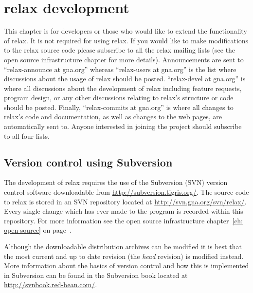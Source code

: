 
\chapter{relax development} \label{ch: relax devel}

This chapter is for developers or those who would like to extend the functionality of relax.  It is not required for using relax.  If you would like to make modifications to the relax source code please subscribe to all the relax mailing lists (see the open source infrastructure chapter for more details).  Announcements are sent to ``relax-announce at gna.org'' whereas ``relax-users at gna.org'' is the list where discussions about the usage of relax should be posted.  ``relax-devel at gna.org'' is where all discussions about the development of relax including feature requests, program design, or any other discussions relating to relax's structure or code should be posted.  Finally, ``relax-commits at gna.org'' is where all changes to relax's code and documentation, as well as changes to the web pages, are automatically sent to.  Anyone interested in joining the project should subscribe to all four lists.




\section{Version control using Subversion}\label{svn repository}

The development of relax requires the use of the Subversion (SVN) version control software downloadable from \href{http://subversion.tigris.org/}{http://subversion.tigris.org/}.  The source code to relax is stored in an SVN repository located at \href{http://svn.gna.org/svn/relax/}{http://svn.gna.org/svn/relax/}.  Every single change which has ever made to the program is recorded within this repository.  For more information see the open source infrastructure chapter~\ref{ch: open source} on page~\pageref{ch: open source}.

Although the downloadable distribution archives can be modified it is best that the most current and up to date revision (the \textit{head} revision) is modified instead.  More information about the basics of version control and how this is implemented in Subversion can be found in the Subversion book located at \href{http://svnbook.red-bean.com/}{http://svnbook.red-bean.com/}.

